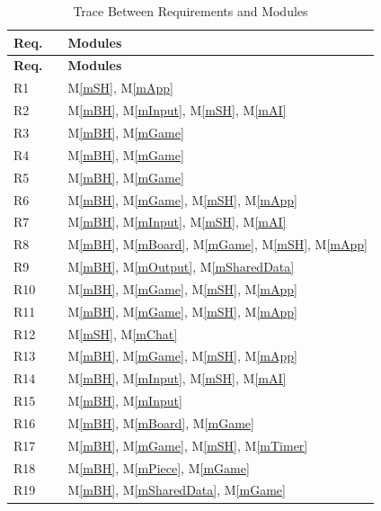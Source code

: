 \documentclass[12pt, titlepage]{article}
\newcommand{\mref}[1]{M\ref{#1}}
\begin{document}
\begin{center}
    \begin{longtable}{l l l}
        \caption{Trace Between Requirements and Modules} \\
        
        \hline \multicolumn{1}{c}{\textbf{Req.}} & \multicolumn{1}{c}{} & \multicolumn{1}{l}{\textbf{Modules}} \\ \hline 
        \endfirsthead
        
        \multicolumn{1}{c}{\textbf{Req.}} & \multicolumn{1}{c}{} & \multicolumn{1}{l}{\textbf{Modules}} \\ \hline 
        \endhead
        
        \hline \hline
        \endlastfoot
        
        R1 && \mref{mSH}, \mref{mApp}\\
        R2 && \mref{mBH}, \mref{mInput}, \mref{mSH}, \mref{mAI}\\
        R3 && \mref{mBH}, \mref{mGame}\\
        R4 && \mref{mBH}, \mref{mGame}\\
        R5 && \mref{mBH}, \mref{mGame}\\
        R6 && \mref{mBH}, \mref{mGame}, \mref{mSH}, \mref{mApp}\\
        R7 && \mref{mBH}, \mref{mInput}, \mref{mSH}, \mref{mAI}\\
        R8 && \mref{mBH}, \mref{mBoard}, \mref{mGame}, \mref{mSH}, \mref{mApp}\\
        R9 && \mref{mBH}, \mref{mOutput}, \mref{mSharedData}\\
        R10 && \mref{mBH}, \mref{mGame}, \mref{mSH}, \mref{mApp}\\
        R11 && \mref{mBH}, \mref{mGame}, \mref{mSH}, \mref{mApp}\\
        R12 && \mref{mSH}, \mref{mChat}\\
        R13 && \mref{mBH}, \mref{mGame}, \mref{mSH}, \mref{mApp}\\
        R14 && \mref{mBH},  \mref{mInput}, \mref{mSH}, \mref{mAI}\\
        R15 && \mref{mBH}, \mref{mInput} \\
        R16 && \mref{mBH}, \mref{mBoard}, \mref{mGame}\\
        R17 && \mref{mBH}, \mref{mGame}, \mref{mSH}, \mref{mTimer}\\
        R18 && \mref{mBH}, \mref{mPiece}, \mref{mGame}\\
        R19 && \mref{mBH}, \mref{mSharedData}, \mref{mGame}\\

\end{longtable}
\end{center}
\end{document}
